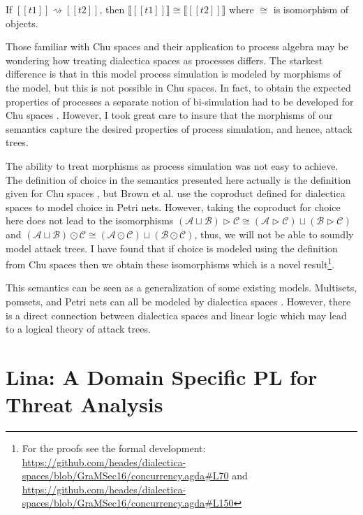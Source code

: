 \documentclass{llncs}
\newcommand{\interp}[1]{\llbracket #1 \rrbracket}
\newcommand{\cat}[1]{\mathcal{#1}}
\begin{document}
\begin{theorem}[Soundness]
  \label{thm:soundness}
  If $[[t1]] \rightsquigarrow [[t2]]$, then $\interp{[[t1]]} \cong
  \interp{[[t2]]}$ where $\cong$ is isomorphism of objects.
\end{theorem}

Those familiar with Chu spaces and their application to process
algebra may be wondering how treating dialectica spaces as processes
differs.  The starkest difference is that in this model process
simulation is modeled by morphisms of the model, but this is not
possible in Chu spaces.  In fact, to obtain the expected properties of
processes a separate notion of bi-simulation had to be developed for
Chu spaces \cite{Gupta:1994}.  However, I took great care to insure
that the morphisms of our semantics capture the desired properties of
process simulation, and hence, attack trees.

The ability to treat morphisms as process simulation was not easy to
achieve.  The definition of choice in the semantics presented here
actually is the definition given for Chu spaces \cite{Gupta:1994}, but
Brown et al. use the coproduct defined for dialectica spaces to model
choice in Petri nets.  However, taking the coproduct for choice here
does not lead to the isomorphisms $(\cat{A} \sqcup \cat{B}) \rhd
\cat{C} \cong (\cat{A} \rhd \cat{C}) \sqcup (\cat{B} \rhd \cat{C})$
and $(\cat{A} \sqcup \cat{B}) \odot \cat{C} \cong (\cat{A} \odot
\cat{C}) \sqcup (\cat{B} \odot \cat{C})$, thus, we will not be able to
soundly model attack trees.  I have found that if choice is modeled
using the definition from Chu spaces \cite{Gupta:1994} then we obtain
these isomorphisms which is a novel result\footnote{For the proofs see
  the formal development:
  \url{https://github.com/heades/dialectica-spaces/blob/GraMSec16/concurrency.agda\#L70}
  and
  \url{https://github.com/heades/dialectica-spaces/blob/GraMSec16/concurrency.agda\#L150}}.

This semantics can be seen as a generalization of some existing
models.  Multisets, pomsets, and Petri nets can all be modeled by
dialectica spaces \cite{Brown:1991,Gupta:1994}.  However, there is a
direct connection between dialectica spaces and linear logic which
may lead to a logical theory of attack trees.

\section{Lina: A Domain Specific PL for Threat Analysis}
\label{sec:lina:_a_domain_specific_pl_for_threat_analysis}
\end{document}
